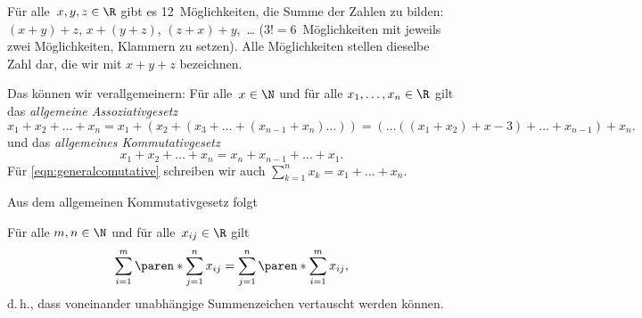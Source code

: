 \documentclass[a4paper]{article}
\begin{document}
\begin{remark}
    Für alle~$x, y, z \in \R$ gibt es 12~Möglichkeiten, die Summe der Zahlen zu bilden: $(x + y) + z$, $x + (y + z)$, $(z + x) + y$,~\dots{} ($3! = 6$~Möglichkeiten mit jeweils zwei Möglichkeiten, Klammern zu setzen). Alle Möglichkeiten stellen dieselbe Zahl dar, die wir mit $x + y + z$ bezeichnen.

    Das können wir verallgemeinern: Für alle~$x \in \N$ und für alle $x_1, \dots, x_n \in \R$ gilt das \emph{allgemeine Assoziativgesetz}
    \begin{equation*}
        x_1 + x_2 + \dots + x_n = x_1 + (x_2 + (x_3 + \dots + (x_{n-1} + x_n) \dots )) = ( \dots ((x_1 + x_2) + x-3) + \dots + x_{n-1}) + x_n.
    \end{equation*}
    und das \emph{allgemeines Kommutativgesetz}
    \begin{equation}
        x_1 + x_2 + \dots + x_n = x_n + x_{n-1} + \dots + x_1. \label{eqn:generalcomutative}
    \end{equation}
    Für \cref{eqn:generalcomutative} schreiben wir auch $\sum_{k=1}^n x_k = x_1 + \dots + x_n$.

    Aus dem allgemeinen Kommutativgesetz folgt
    \begin{theorem}[Doppelsumme]
        Für alle $m, n \in \N$ und für alle~$x_{ij} \in \R$ gilt
        \begin{equation*}
            \sum_{i=1}^m \paren*{\sum_{j=1}^n x_{ij}} = \sum_{j=1}^n \paren*{\sum_{i=1}^m x_{ij}},
        \end{equation*}
        d.\,h., dass voneinander unabhängige Summenzeichen vertauscht werden können.
    \end{theorem}


\end{remark}
\end{document}
